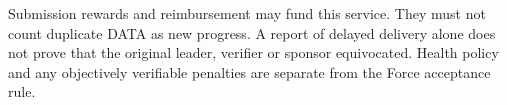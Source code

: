 \documentclass[11pt,a4paper]{article}
\begin{document}
Submission rewards and reimbursement may fund this service. They must not
count duplicate DATA as new progress. A report of delayed delivery
alone does not prove that the original leader, verifier or sponsor
equivocated. Health policy and any objectively verifiable penalties
are separate from the Force acceptance rule.
\end{document}
